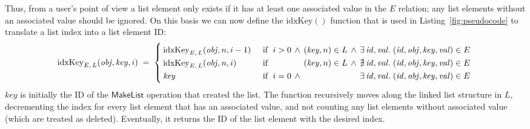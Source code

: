 Thus, from a user's point of view a list element only exists if it has at least one associated value in the $E$ relation; any list elements without an associated value should be ignored.
On this basis we can now define the $\mathrm{idxKey}()$ function that is used in Listing~\ref{fig:pseudocode} to translate a list index into a list element ID:
\[ \mathrm{idxKey}_{E,\, L}(\mathit{obj}, \mathit{key}, i) \;=\; \left\{
   \arraycolsep=2pt \def\arraystretch{1.3}
   \begin{array}{llllll}
       \mathrm{idxKey}_{E,\, L}(\mathit{obj}, n, i-1) &
       \quad\text{if }\; i > 0 & \wedge & (\mathit{key}, n) \in L & \wedge &
       \exists\,\mathit{id}, \mathit{val}.\; (\mathit{id}, \mathit{obj}, \mathit{key}, \mathit{val}) \in E \\
       \mathrm{idxKey}_{E,\, L}(\mathit{obj}, n, i) &
       \quad\text{if }\; && (\mathit{key}, n) \in L & \wedge &
       \nexists\,\mathit{id}, \mathit{val}.\; (\mathit{id}, \mathit{obj}, \mathit{key}, \mathit{val}) \in E \\
       \mathit{key} &
       \quad\text{if }\; i = 0 & \wedge &&&
       \exists\,\mathit{id}, \mathit{val}.\; (\mathit{id}, \mathit{obj}, \mathit{key}, \mathit{val}) \in E \\
   \end{array} \right. \]
$\mathit{key}$ is initially the ID of the $\mathsf{MakeList}$ operation that created the list.
The function recursively moves along the linked list structure in $L$, decrementing the index for every list element that has an associated value, and not counting any list elements without associated value (which are treated as deleted).
Eventually, it returns the ID of the list element with the desired index.
